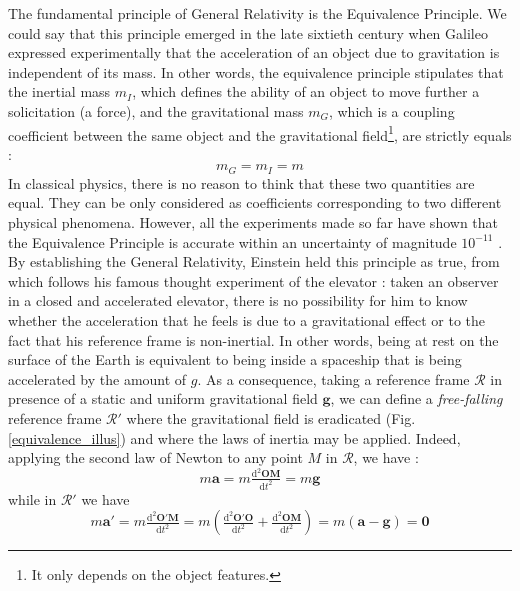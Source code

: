 The fundamental principle of General Relativity is the Equivalence Principle. We
could say that this principle emerged in the late sixtieth century when Galileo
expressed experimentally that the acceleration of an object due to gravitation is
independent of its mass.
In other words, the equivalence principle stipulates that the inertial mass $m_{I}$, which defines the ability of an object
to move further a solicitation (a force), and the gravitational mass $m_{G}$, which is a coupling coefficient between the
same object and the gravitational field\footnote{It only depends on the object features.}, are strictly equals :
%
\begin{equation}
	m_{G} = m_{I} = m
\end{equation}
%
In classical physics, there is no reason to think that these two quantities are equal.
They can be only considered as coefficients corresponding to two different physical
phenomena. However, all the experiments made so far have shown that the Equivalence Principle is accurate within an
uncertainty of magnitude $10^{-11}$ \cite{schlamminger2008test}.
By establishing the General Relativity, Einstein held this principle as true, from which follows his famous thought experiment of the elevator :
taken an observer in a closed and accelerated elevator,
there is no possibility for him to know whether the acceleration that he feels is due to a gravitational effect or to the fact that his reference
frame is non-inertial. In other words, being at rest on the surface of the Earth is equivalent to being inside
a spaceship that is being accelerated by the amount of $g$.
As a consequence, taking a reference frame $\mathcal{R}$ in presence of a static and uniform gravitational field
$\textbf{g}$, we can define a \textit{free-falling} reference frame $\mathcal{R}'$ where the gravitational field is eradicated (Fig. \ref{equivalence_illus}) and where
the laws of inertia may be applied. Indeed, applying the second law of Newton to any point $M$ in $\mathcal{R}$, we have :
%
\begin{equation}
 m\mathbf{a} = m\tfrac{\mathrm{d}^2\mathbf{OM}}{\mathrm{d}t^2} = m \mathbf{g}
\end{equation}
%
while in $\mathcal{R}'$ we have
%
\begin{equation}
 m \mathbf{a'} = m\tfrac{\mathrm{d}^2\mathbf{O'M}}{\mathrm{d}t^2}
 = m \left( \tfrac{\mathrm{d}^2\mathbf{O'O}}{\mathrm{d}t^2} + \tfrac{\mathrm{d}^2\mathbf{OM}}{\mathrm{d}t^2}\right)
 = m\left(\mathbf{a} - \mathbf{g}\right) = \mathbf{0}
\end{equation}

